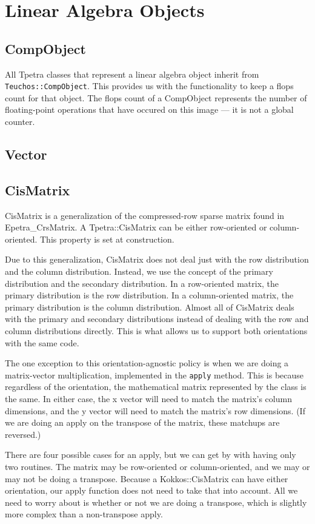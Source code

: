 \documentclass[10pt,relax]{TpetraDesign}
\begin{document}
\section{Linear Algebra Objects}

\subsection{CompObject}
All Tpetra classes that represent a linear algebra object inherit from \texttt{Teuchos::CompObject}. This provides us with the functionality to keep a flops count for that object. The flops count of a CompObject represents the number of floating-point operations that have occured on this image --- it is not a global counter.

\subsection{Vector}

\subsection{CisMatrix}
CisMatrix is a generalization of the compressed-row sparse matrix found in Epetra\_CrsMatrix. A Tpetra::CisMatrix can be either row-oriented or column-oriented. This property is set at construction.

Due to this generalization, CisMatrix does not deal just with the row distribution and the column distribution. Instead, we use the concept of the primary distribution and the secondary distribution. In a row-oriented matrix, the primary distribution is the row distribution. In a column-oriented matrix, the primary distribution is the column distribution. Almost all of CisMatrix deals with the primary and secondary distributions instead of dealing with the row and column  distributions directly. This is what allows us to support both orientations with the same code.

The one exception to this orientation-agnostic policy is when we are doing a matrix-vector multiplication, implemented in the \texttt{apply} method. This is because regardless of the orientation, the mathematical matrix represented by the class is the same. In either case, the x vector will need to match the matrix's column dimensions, and the y vector will need to match the matrix's row dimensions. (If we are doing an apply on the transpose of the matrix, these matchups are reversed.)

There are four possible cases for an apply, but we can get by with having only two routines. The matrix may be row-oriented or column-oriented, and we may or may not be doing a transpose. Because a Kokkos::CisMatrix can have either orientation, our apply function does not need to take that into account. All we need to worry about is whether or not we are doing a transpose, which is slightly more complex than a non-transpose apply.
\end{document}
